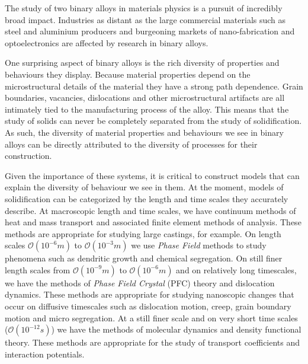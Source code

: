 \label{chapter:introduction}



The study of two binary alloys in materials physics is a pursuit of incredibly
broad impact. Industries as distant as the large commercial materials such as
steel and aluminium producers and burgeoning markets of nano-fabrication and
optoelectronics are affected by research in binary alloys.

One surprising aspect of binary alloys is the rich diversity of properties and
behaviours they display. Because material properties depend on the
microstructural details of the material they have a strong path dependence.
Grain boundaries, vacancies, dislocations and other microstructural artifacts
are all intimately tied to the manufacturing process of the alloy. This means
that the study of solids can never be completely separated from the study of
solidification. As such, the diversity of material properties and behaviours we
see in binary alloys can be directly attributed to the diversity of processes
for their construction.

Given the importance of these systems, it is critical to construct models that
can explain the diversity of behaviour we see in them. At the moment, models of
solidification can be categorized by the length and time scales they accurately
describe. At macroscopic length and time scales, we have continuum methods of
heat and mass transport and associated finite element methods of analysis. These
methods are appropriate for studying large castings, for example. On length
scales $\mathcal{O}(10^{-6}m)$ to $\mathcal{O}(10^{-3}m)$ we use
\textit{Phase Field} methods to study phenomena such as dendritic growth and
chemical segregation. On still finer length scales from $\mathcal{O}(10^{-9}m)$
to $\mathcal{O}(10^{-6}m)$ and on relatively long timescales, we have the
methods of \textit{Phase Field Crystal} (PFC) theory and dislocation dynamics.
These methods are appropriate for studying nanoscopic changes that occur on
diffusive timescales such as dislocation motion, creep, grain boundary motion
and micro segregation. At a still finer scale and on very short time scales
($\mathcal{O}(10^{-12}s)$) we have the methods of molecular dynamics and density
functional theory. These methods are appropriate for the study of transport
coefficients and interaction potentials.

